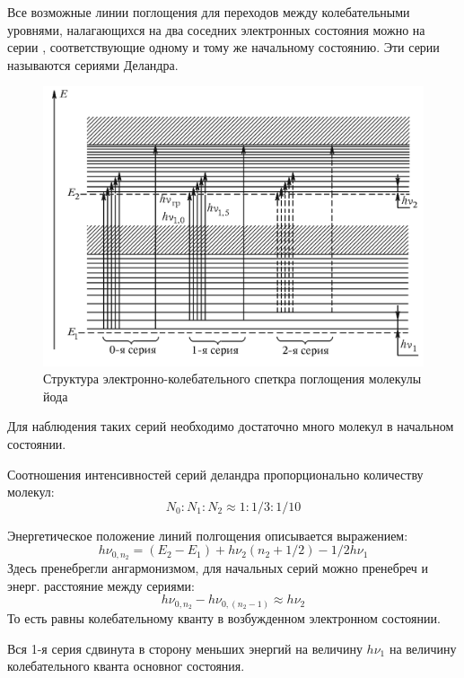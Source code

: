 \documentclass[a4paper]{article}
\begin{document}
Все возможные линии поглощения для переходов между колебательными уровнями, налагающихся
на два соседних электронных состояния можно на серии , соответствующие одному и тому же
начальному состоянию. Эти серии называются сериями Деландра.


\begin{figure}[H]
    \begin{center}
    \includegraphics[scale = 0.3]{p5.png}
    \caption{Структура электронно-колебательного спеткра поглощения молекулы йода}
    \label{p5}
    \end{center}
\end{figure}

Для наблюдения таких серий необходимо достаточно много молекул в начальном состоянии.\par

Соотношения интенсивностей серий деландра пропорционально количеству молекул:
$$N_0 : N_1 : N_2 \approx 1 : 1/3 : 1/10$$

Энергетическое положение линий полгощения описывается выражением:
$$h\nu_{0,n_2} = (E_2 - E_1) + h\nu_2 (n_2+1/2) - 1/2 h\nu_1$$
Здесь пренебрегли ангармонизмом, для начальных серий можно пренебреч и энерг. расстояние между сериями:
$$h\nu_{0,n_2} - h\nu_{0,(n_2 - 1)} \approx h\nu_2$$
То есть равны колебательному кванту в возбужденном электронном состоянии.\par

Вся 1-я серия сдвинута в сторону меньших энергий на величину $h\nu_1$ на величину колебательного кванта основног состояния.
\end{document}
